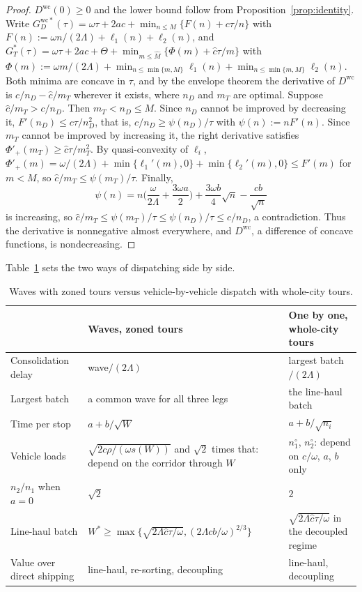 \documentclass[10pt, reqno]{amsart}
\theoremstyle{definition}
\begin{document}
\begin{proof}
$D^{\mathrm{wc}}(0)\ge0$ and the lower bound follow from Proposition~\ref{prop:identity}. Write $G_D^{\mathrm{wc}*}(\tau)=\omega\tau+2ac+\min_{n\le M}\{F(n)+c\tau/n\}$ with $F(n):=\omega n/(2\Lambda)+\ell_1(n)+\ell_2(n)$, and $G_T^*(\tau)=\omega\tau+2ac+\Theta+\min_{m\le\hat M}\{\Phi(m)+\hat c\tau/m\}$ with $\Phi(m):=\omega m/(2\Lambda)+\min_{n\le\min\{m,M\}}\ell_1(n)+\min_{n\le\min\{m,M\}}\ell_2(n)$. Both minima are concave in $\tau$, and by the envelope theorem the derivative of $D^{\mathrm{wc}}$ is $c/n_D-\hat c/m_T$ wherever it exists, where $n_D$ and $m_T$ are optimal. Suppose $\hat c/m_T>c/n_D$. Then $m_T<n_D\le M$. Since $n_D$ cannot be improved by decreasing it, $F'(n_D)\le c\tau/n_D^2$, that is, $c/n_D\ge\psi(n_D)/\tau$ with $\psi(n):=nF'(n)$. Since $m_T$ cannot be improved by increasing it, the right derivative satisfies $\Phi'_+(m_T)\ge\hat c\tau/m_T^2$. By quasi-convexity of $\ell_i$, $\Phi'_+(m)=\omega/(2\Lambda)+\min\{\ell_1'(m),0\}+\min\{\ell_2'(m),0\}\le F'(m)$ for $m<M$, so $\hat c/m_T\le\psi(m_T)/\tau$. Finally,
\[
\psi(n)=n\Big(\frac{\omega}{2\Lambda}+\frac{3\omega a}{2}\Big)+\frac{3\omega b}{4}\sqrt n-\frac{cb}{\sqrt n}
\]
is increasing, so $\hat c/m_T\le\psi(m_T)/\tau\le\psi(n_D)/\tau\le c/n_D$, a contradiction. Thus the derivative is nonnegative almost everywhere, and $D^{\mathrm{wc}}$, a difference of concave functions, is nondecreasing.
\end{proof}

Table~\ref{tab:compare} sets the two ways of dispatching side by side.

\begin{table}[h]
\centering
\caption{Waves with zoned tours versus vehicle-by-vehicle dispatch with whole-city tours.}\label{tab:compare}
\begin{tabular}{p{}p{}p{}}
\toprule
 & Waves, zoned tours & One by one, whole-city tours\\
\midrule
Consolidation delay & wave$/(2\Lambda)$ & largest batch$/(2\Lambda)$\\
Largest batch & a common wave for all three legs & the line-haul batch\\
Time per stop & $a+b/\sqrt W$ & $a+b/\sqrt{n_i}$\\
Vehicle loads & $\sqrt{2c\rho/(\omega s(W))}$ and $\sqrt2$ times that: depend on the corridor through $W$ & $n_1^\circ$, $n_2^\circ$: depend on $c/\omega$, $a$, $b$ only\\
$n_2/n_1$ when $a=0$ & $\sqrt2$ & $2$\\
Line-haul batch & $W^*\ge\max\{\sqrt{2\Lambda\hat c\tau/\omega},(2\Lambda cb/\omega)^{2/3}\}$ & $\sqrt{2\Lambda\hat c\tau/\omega}$ in the decoupled regime\\
Value over direct shipping & line-haul, re-sorting, decoupling & line-haul, decoupling\\
\bottomrule
\end{tabular}
\end{table}
\end{document}
